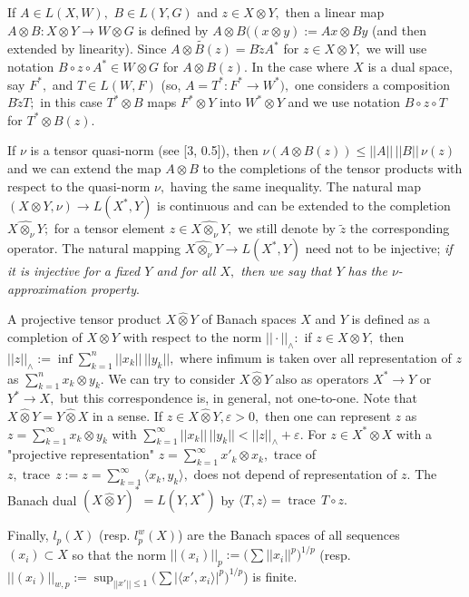   If $A\in L(X,W),$ $B\in L(Y,G)$ and $z\in X\otimes Y,$ then  a linear map
  $A\otimes B: X\otimes Y\to W\otimes G$ is defined by
  $A\otimes B((x\otimes y):= Ax\otimes By$ (and then extended by linearity). Since
 $\widetilde{A\otimes B(z)}= B\widetilde z A^*$ for $z\in X\otimes Y,$ we will use notation
$B\circ z \circ A^*\in W\otimes G$ for $A\otimes B(z).$
In the case where $X$ is a dual space, say $F^*,$ and $T\in L(W,F)$
(so, $A=T^*: F^*\to W^*),$
one considers a composition $B\widetilde z T;$ in this case $T^*\otimes B$ maps
$F^*\otimes Y$ into $W^*\otimes Y$ and
we use notation
$B\circ z\circ T$ for $T^*\otimes B (z).$

If $\nu$ is a tensor quasi-norm (see [3, 0.5]),
then $\nu(A\otimes B (z))\le ||A||\, ||B||\, \nu(z)$  and we can extend the map
$A\otimes B$ to the comple\-tions of the tensor products with respect to the quasi-norm
$\nu,$ having the same inequality. The natural map $(X\otimes Y, \nu)\to L(X^*, Y)$
is continuous and can be extended to the completion $\widehat{X\otimes_\nu Y};$ for
a tensor element $z\in \widehat{X\otimes_\nu Y},$ we still denote by $\widetilde z$ the corresponding
operator. The natural mapping
  $\widehat{X\otimes_\nu Y}\to L(X^*, Y)$  need not to be injective; {\it if it is injective
  for a fixed $Y$ and for all $X,$ then we say that $Y$ has the $\nu$-approximation property}.

A projective tensor product $X\widehat\otimes Y$ of Banach spaces $X$ and $Y$ is defined
as a completion of $X\otimes Y$ with respect to the norm $||\cdot||_{\land}:$
if $z\in X\otimes Y,$ then
$ ||z||_\land:= \inf \sum_{k=1}^n ||x_k||\, ||y_k||,
$
where infimum is taken over all representation of $z$ as $\sum_{k=1}^n x_k\otimes y_k.$
We can try to consider
    $X\widehat\otimes Y$ also as operators $X^*\to Y$ or $Y^*\to X,$ but this
    correspondence is, in general, not one-to-one.
Note that $X\widehat\otimes Y= Y\widehat\otimes X$ in a sense.
If $z\in X\widehat\otimes Y, \varepsilon>0,$ then one can represent $z$ as
$z=\sum_{k=1}^\infty x_k\otimes y_k$ with $\sum_{k=1}^\infty ||x_k||\, ||y_k||<||z||_\land+\varepsilon.$
For $z\in X^*\widehat\otimes X$ with a "projective representation" $z=\sum_{k=1}^\infty x'_k\otimes x_k,$
trace of $z, \operatorname{trace}\, z:=z=\sum_{k=1}^\infty \langle x_k, y_k\rangle,$ does not depend of representation of $z.$
The Banach dual $(X\widehat\otimes Y)^*= L(Y,X^*)$ by $\langle T, z\rangle=\operatorname{trace}\, T\circ z.$

Finally,
$l_p(X)$ (resp. $l^w_p(X)$) are the Banach spaces of all sequences  $(x_i)\subset X$ so that
the norm  $ ||(x_i)||_p:=\big(\sum ||x_i||^p\big)^{1/p}$
(resp. $||(x_i)||_{w,p}:= \sup_{||x'||\le1}\big(\sum |\langle x', x_i\rangle|^p\big)^{1/p}$) is finite.

